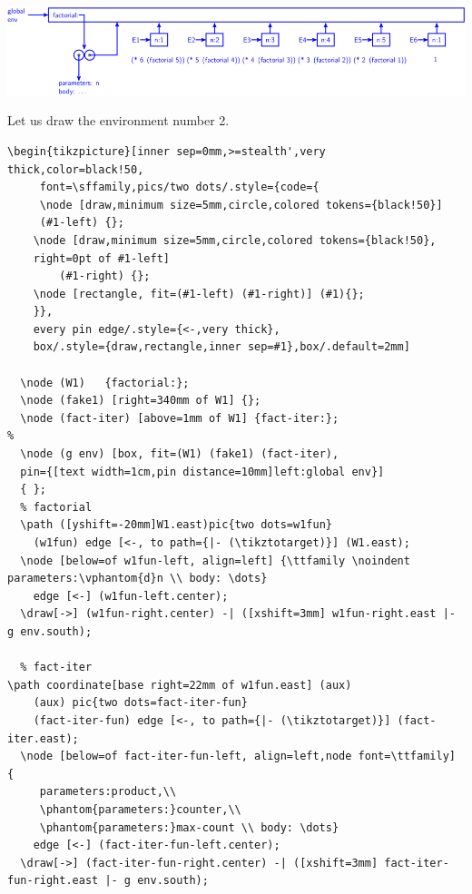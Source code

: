 \documentclass[a4paper,12pt,twoside]{report}
\begin{document}
\begin{center}
\includegraphics[width=.9\linewidth]{exercise-3-9-part-1.png}
\end{center}


Let us draw the environment number 2.


\lstset{numbers=left,frame=single,language=[LaTeX]TeX,label=org948427c,caption= ,captionpos=b}
\begin{lstlisting}
\begin{tikzpicture}[inner sep=0mm,>=stealth',very thick,color=black!50,
     font=\sffamily,pics/two dots/.style={code={
     \node [draw,minimum size=5mm,circle,colored tokens={black!50}]
     (#1-left) {};
    \node [draw,minimum size=5mm,circle,colored tokens={black!50},
    right=0pt of #1-left]
        (#1-right) {};
    \node [rectangle, fit=(#1-left) (#1-right)] (#1){};
    }},
    every pin edge/.style={<-,very thick},
    box/.style={draw,rectangle,inner sep=#1},box/.default=2mm]

  \node (W1)   {factorial:};
  \node (fake1) [right=340mm of W1] {};
  \node (fact-iter) [above=1mm of W1] {fact-iter:};
%
  \node (g env) [box, fit=(W1) (fake1) (fact-iter),
  pin={[text width=1cm,pin distance=10mm]left:global env}]
  { };
  % factorial
  \path ([yshift=-20mm]W1.east)pic{two dots=w1fun}
    (w1fun) edge [<-, to path={|- (\tikztotarget)}] (W1.east);
  \node [below=of w1fun-left, align=left] {\ttfamily \noindent parameters:\vphantom{d}n \\ body: \dots}
    edge [<-] (w1fun-left.center);
  \draw[->] (w1fun-right.center) -| ([xshift=3mm] w1fun-right.east |- g env.south);

  % fact-iter
\path coordinate[base right=22mm of w1fun.east] (aux)
    (aux) pic{two dots=fact-iter-fun}
    (fact-iter-fun) edge [<-, to path={|- (\tikztotarget)}] (fact-iter.east);
  \node [below=of fact-iter-fun-left, align=left,node font=\ttfamily] {
     parameters:product,\\
     \phantom{parameters:}counter,\\
     \phantom{parameters:}max-count \\ body: \dots}
    edge [<-] (fact-iter-fun-left.center);
  \draw[->] (fact-iter-fun-right.center) -| ([xshift=3mm] fact-iter-fun-right.east |- g env.south);


\end{lstlisting}
\end{document}
